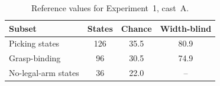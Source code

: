 \begin{table}[H]
\centering
\caption{Reference values for Experiment~1, cast~A.}
\label{tab:ex1:floors}
\begin{tabular}{@{}l S[table-format=3.0] S[table-format=2.1] S[table-format=2.1]@{}}
\toprule
Subset & {States} & {Chance} & {Width-blind} \\
\midrule
Picking states & 126 & 35.5 & 80.9 \\
\quad Grasp-binding & 96 & 30.5 & 74.9 \\
No-legal-arm states & 36 & 22.0 & {--} \\
\bottomrule
\end{tabular}
\end{table}
